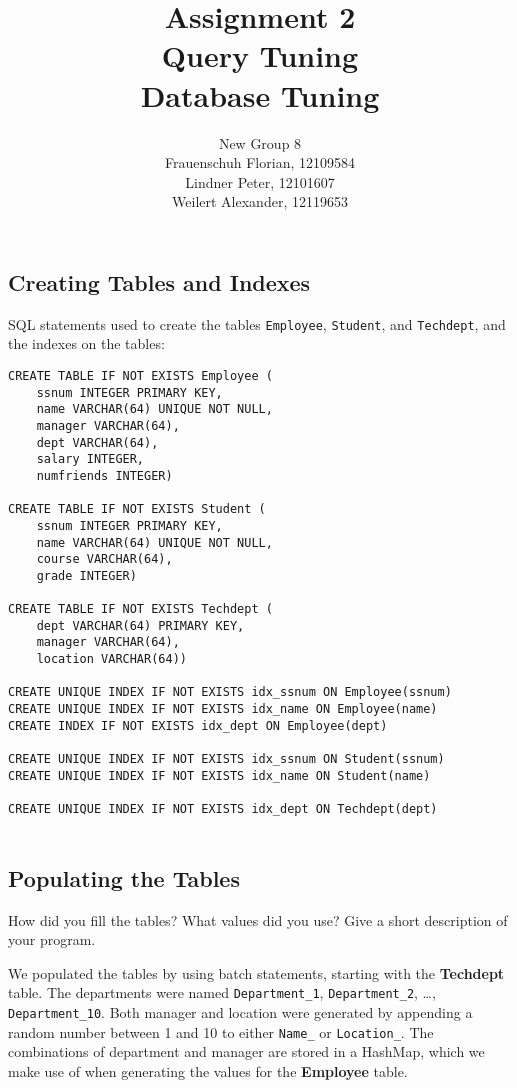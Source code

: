 \documentclass[11pt]{scrartcl}
\title{
    \textbf{\large Assignment 2} \\
    Query Tuning \\
    {\large Database Tuning}
}
\author{
    New Group 8 \\
    \large Frauenschuh Florian, 12109584 \\
    \large Lindner Peter, 12101607 \\
    \large Weilert Alexander, 12119653
}
\begin{document}
    \maketitle\thispagestyle{empty}

    \subsection*{Creating Tables and Indexes}

    SQL statements used to create the tables \texttt{Employee}, \texttt{Student}, and \texttt{Techdept}, and the indexes on the tables:

    \begin{lstlisting}[style=dbtsql]
CREATE TABLE IF NOT EXISTS Employee (
    ssnum INTEGER PRIMARY KEY, 
    name VARCHAR(64) UNIQUE NOT NULL, 
    manager VARCHAR(64), 
    dept VARCHAR(64), 
    salary INTEGER, 
    numfriends INTEGER)

CREATE TABLE IF NOT EXISTS Student (
    ssnum INTEGER PRIMARY KEY, 
    name VARCHAR(64) UNIQUE NOT NULL,
    course VARCHAR(64), 
    grade INTEGER)

CREATE TABLE IF NOT EXISTS Techdept (
    dept VARCHAR(64) PRIMARY KEY, 
    manager VARCHAR(64), 
    location VARCHAR(64))

CREATE UNIQUE INDEX IF NOT EXISTS idx_ssnum ON Employee(ssnum)
CREATE UNIQUE INDEX IF NOT EXISTS idx_name ON Employee(name)
CREATE INDEX IF NOT EXISTS idx_dept ON Employee(dept)

CREATE UNIQUE INDEX IF NOT EXISTS idx_ssnum ON Student(ssnum)
CREATE UNIQUE INDEX IF NOT EXISTS idx_name ON Student(name)

CREATE UNIQUE INDEX IF NOT EXISTS idx_dept ON Techdept(dept)


    \end{lstlisting}

    \subsection*{Populating the Tables}

    How did you fill the tables? What values did you use? Give a short description of your program.

    We populated the tables by using batch statements, starting with the \textbf{Techdept} table.
    The departments were named \texttt{Department\_1}, \texttt{Department\_2}, \dots, \texttt{Department\_10}.
    Both manager and location were generated by appending a random number between 1 and 10 to either \texttt{Name\_} or \texttt{Location\_}.
    The combinations of department and manager are stored in a HashMap, which we make use of when generating the values for the \textbf{Employee} table.
\end{document}
